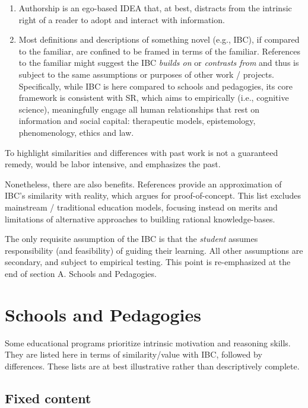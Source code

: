 \documentclass[
]{book}
\providecommand{\tightlist}{%
  \setlength{\itemsep}{0pt}\setlength{\parskip}{0pt}}
\begin{document}
\begin{enumerate}
\def\labelenumi{\arabic{enumi}.}
\tightlist
\item
  Authorship is an ego-based IDEA that, at best, distracts from the intrinsic right of a reader to adopt and interact with information.\\
\item
  Most definitions and descriptions of something novel (e.g., IBC), if compared to the familiar, are confined to be framed in terms of the familiar. References to the familiar might suggest the IBC \emph{builds on} or \emph{contrasts from} and thus is subject to the same assumptions or purposes of other work / projects.
  Specifically, while IBC is here compared to schools and pedagogies, its core framework is consistent with SR, which aims to empirically (i.e., cognitive science), meaningfully engage all human relationships that rest on information and social capital: therapeutic models, epistemology, phenomenology, ethics and law.
\end{enumerate}

To highlight similarities and differences with past work is not a guaranteed remedy, would be labor intensive, and emphasizes the past.

Nonetheless, there are also benefits.
References provide an approximation of IBC's similarity with reality, which argues for proof-of-concept.
This list excludes mainstream / traditional education models, focusing instead on merits and limitations of alternative approaches to building rational knowledge-bases.

The only requisite assumption of the IBC is that the \emph{student} assumes responsibility (and feasibility) of guiding their learning. All other assumptions are secondary, and subject to empirical testing. This point is re-emphasized at the end of section A. Schools and Pedagogies.

\section{Schools and Pedagogies}\label{schools-and-pedagogies}

Some educational programs prioritize intrinsic motivation and reasoning skills. They are listed here in terms of similarity/value with IBC, followed by differences. These lists are at best illustrative rather than descriptively complete.

\subsection{Fixed content}\label{fixed-content}
\end{document}
